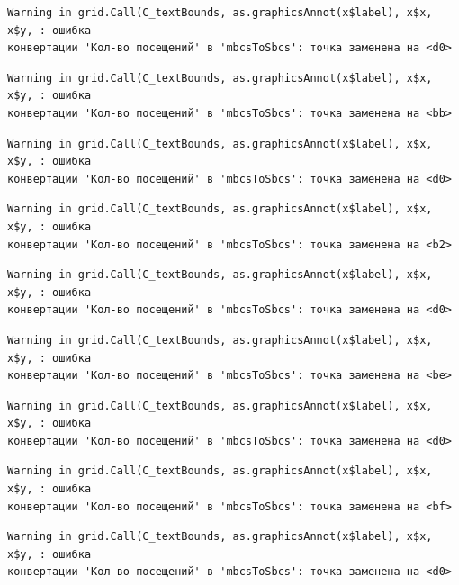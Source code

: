 \documentclass[
  letterpaper,
  DIV=11,
  numbers=noendperiod]{scrreprt}
\begin{document}
\begin{verbatim}
Warning in grid.Call(C_textBounds, as.graphicsAnnot(x$label), x$x, x$y, : ошибка
конвертации 'Кол-во посещений' в 'mbcsToSbcs': точка заменена на <d0>
\end{verbatim}

\begin{verbatim}
Warning in grid.Call(C_textBounds, as.graphicsAnnot(x$label), x$x, x$y, : ошибка
конвертации 'Кол-во посещений' в 'mbcsToSbcs': точка заменена на <bb>
\end{verbatim}

\begin{verbatim}
Warning in grid.Call(C_textBounds, as.graphicsAnnot(x$label), x$x, x$y, : ошибка
конвертации 'Кол-во посещений' в 'mbcsToSbcs': точка заменена на <d0>
\end{verbatim}

\begin{verbatim}
Warning in grid.Call(C_textBounds, as.graphicsAnnot(x$label), x$x, x$y, : ошибка
конвертации 'Кол-во посещений' в 'mbcsToSbcs': точка заменена на <b2>
\end{verbatim}

\begin{verbatim}
Warning in grid.Call(C_textBounds, as.graphicsAnnot(x$label), x$x, x$y, : ошибка
конвертации 'Кол-во посещений' в 'mbcsToSbcs': точка заменена на <d0>
\end{verbatim}

\begin{verbatim}
Warning in grid.Call(C_textBounds, as.graphicsAnnot(x$label), x$x, x$y, : ошибка
конвертации 'Кол-во посещений' в 'mbcsToSbcs': точка заменена на <be>
\end{verbatim}

\begin{verbatim}
Warning in grid.Call(C_textBounds, as.graphicsAnnot(x$label), x$x, x$y, : ошибка
конвертации 'Кол-во посещений' в 'mbcsToSbcs': точка заменена на <d0>
\end{verbatim}

\begin{verbatim}
Warning in grid.Call(C_textBounds, as.graphicsAnnot(x$label), x$x, x$y, : ошибка
конвертации 'Кол-во посещений' в 'mbcsToSbcs': точка заменена на <bf>
\end{verbatim}

\begin{verbatim}
Warning in grid.Call(C_textBounds, as.graphicsAnnot(x$label), x$x, x$y, : ошибка
конвертации 'Кол-во посещений' в 'mbcsToSbcs': точка заменена на <d0>
\end{verbatim}
\end{document}
